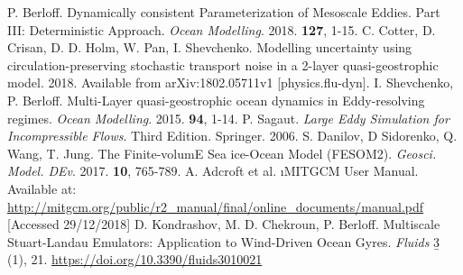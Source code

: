 \documentclass[11pt]{article}
\begin{document}
\begin{thebibliography}{9}
	  P. Berloff. Dynamically consistent Parameterization of Mesoscale Eddies. Part III: Deterministic Approach. \textit{Ocean Modelling}. 2018. \textbf{127}, 1-15.
	 C. Cotter, D. Crisan, D. D. Holm, W. Pan, I. Shevchenko. Modelling uncertainty using circulation-preserving stochastic transport noise in a 2-layer quasi-geostrophic model. 2018. Available from arXiv:1802.05711v1 [physics.flu-dyn].
	 I. Shevchenko, P. Berloff. Multi-Layer quasi-geostrophic ocean dynamics in Eddy-resolving regimes. \textit{Ocean Modelling}. 2015. \textbf{94}, 1-14.
	 P. Sagaut. \textit{Large Eddy Simulation for Incompressible Flows}. Third Edition. Springer. 2006. 
	 S. Danilov, D Sidorenko, Q. Wang, T. Jung. The Finite-volumE Sea ice-Ocean Model (FESOM2). \textit{Geosci. Model. DEv}. 2017. \textbf{10}, 765-789.
	 A. Adcroft et al. \i{MITGCM User Manual}. Available at: \url{http://mitgcm.org/public/r2_manual/final/online_documents/manual.pdf} [Accessed 29/12/2018]
	 D. Kondrashov, M. D. Chekroun, P. Berloff. Multiscale Stuart-Landau Emulators: Application to Wind-Driven Ocean Gyres. \textit{Fluids} \b{3} (1), 21. \url{https://doi.org/10.3390/fluids3010021}
\end{thebibliography}
\end{document}
